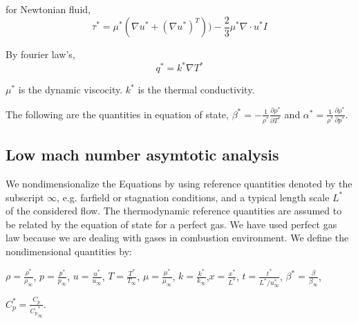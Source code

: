 \bigskip

for Newtonian fluid, $$\tau^* = \mu^*(\nabla u^* +(\nabla u^*)^T)) - \frac{2}{3}\mu^*\nabla \cdot u^*I$$

By fourier law's, 
$$q^* =  k^* \nabla T^*$$

\bigskip

$\mu^*$ is the dynamic viscocity. $k^*$ is the thermal conductivity.

\bigskip

\noindent The following are the quantities in equation of state, $\beta^* = -\frac{1}{\rho^*}\frac{\partial \rho^*}{\partial T^*}$ and $\alpha^* = \frac{1}{\rho^*}\frac{\partial \rho^*}{\partial p^*}$.

\subsection{Low mach number asymtotic analysis}

We nondimensionalize the Equations by using reference quantities denoted by the subscript $\infty$,
e.g. farfield or stagnation conditions, and a typical length scale $L^*$ of the considered
flow. The thermodynamic reference quantities are assumed to be related by the equation of
state for a perfect gas. We have used perfect gas law because we are dealing with gases in combustion environment. We define the nondimensional quantities by:\\

\bigskip

$\rho = \frac{\rho^*}{\rho_\infty} $, $p = \frac{p^*}{p_\infty} $, $u = \frac{u^*}{u_\infty} $, $T = \frac{T^*}{T_\infty} $, $\mu = \frac{\mu^*}{\mu_\infty} $, $k = \frac{k^*}{k_\infty} $,$x = \frac{x^*}{L^*} $, $t = \frac{t^*}{L^*/u^*_{\infty}} $, $\beta^* = \frac{\beta}{\beta_{\infty}} $, 
\bigskip

$C_p^* = \frac{C_p}{{C_p}^*_{\infty}}$.

